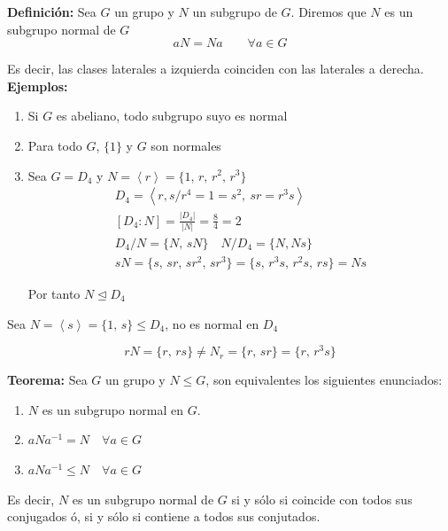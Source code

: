 \documentclass{article}
\begin{document}
\textbf{Definición:} Sea $G$ un grupo y $N$ un subgrupo de $G$. Diremos que $N$ es un subgrupo normal de $G$
\begin{equation*}
aN=Na \qquad \forall a\in G
\end{equation*}

Es decir, las clases laterales a izquierda coinciden con las laterales a derecha. \\

\textbf{Ejemplos:}
\begin{enumerate}[(1)]
\item Si $G$ es abeliano, todo subgrupo suyo es normal

\item Para todo $G$, $\{1\}$ y $G$ son normales

\item Sea $G=D_4$ y $N=\left\langle r\right\rangle=\{1,\,r,\,r^2,\,r^3\}$
\begin{gather*}
D_4=\left\langle r,s/r^4=1=s^2,\:sr=r^3s\right\rangle \\
\left[ D_4:N\right] =\frac{|D_4|}{|N|}=\frac{8}{4}=2 \\
D_4/N=\{N,\,sN\}\quad N/D_4=\{N,Ns\} \\
sN=\{s,\,sr,\,sr^2,\,sr^3\}=\{s,\,r^3s,\,r^2s,\,rs\}=Ns
\end{gather*}

Por tanto $N\unlhd D_4$
\end{enumerate}

Sea $N=\left\langle s \right\rangle = \{1,\,s\}\leq D_4$, no es normal en $D_4$

\begin{equation*}
rN=\{r,\,rs\}\neq N_r=\{r,\,sr\}=\{r,\,r^3s\}
\end{equation*}

\textbf{Teorema:} Sea $G$ un grupo y $N \leq G$, son equivalentes los siguientes enunciados:

\begin{enumerate}[(1)]
\item $N$ es un subgrupo normal en $G$.

\item $aNa^{-1}=N\quad \forall a\in G$

\item $aNa^{-1}\leq N \quad \forall a \in G$
\end{enumerate}

Es decir, $N$ es un subgrupo normal de $G$ si y sólo si coincide con todos sus conjugados ó, si y sólo si contiene a todos sus conjutados. \\
\end{document}

